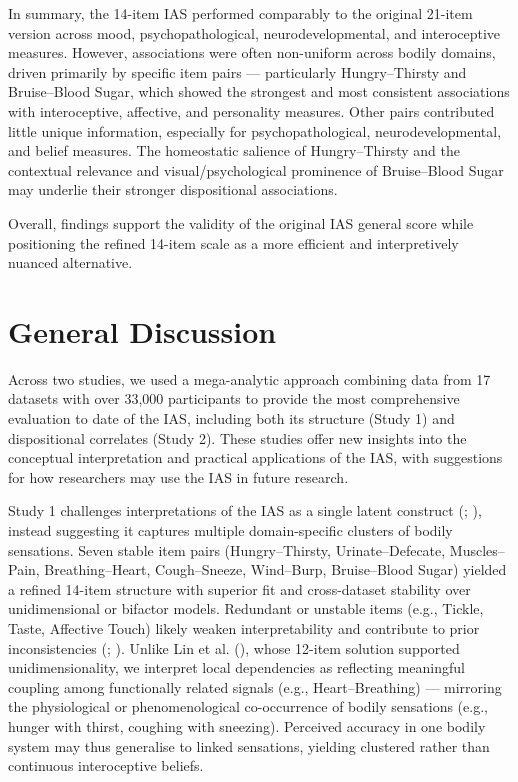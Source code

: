 \documentclass[
  jou,
  floatsintext,
  longtable,
  nolmodern,
  notxfonts,
  notimes,
  colorlinks=true,linkcolor=blue,citecolor=blue,urlcolor=blue]{apa7}
\begin{document}
In summary, the 14-item IAS performed comparably to the original 21-item
version across mood, psychopathological, neurodevelopmental, and
interoceptive measures. However, associations were often non-uniform
across bodily domains, driven primarily by specific item pairs ---
particularly Hungry--Thirsty and Bruise--Blood Sugar, which showed the
strongest and most consistent associations with interoceptive,
affective, and personality measures. Other pairs contributed little
unique information, especially for psychopathological,
neurodevelopmental, and belief measures. The homeostatic salience of
Hungry--Thirsty and the contextual relevance and visual/psychological
prominence of Bruise--Blood Sugar may underlie their stronger
dispositional associations.

Overall, findings support the validity of the original IAS general score
while positioning the refined 14-item scale as a more efficient and
interpretively nuanced alternative.

\section{General Discussion}\label{general-discussion}

Across two studies, we used a mega-analytic approach combining data from
17 datasets with over 33,000 participants to provide the most
comprehensive evaluation to date of the IAS, including both its
structure (Study 1) and dispositional correlates (Study 2). These
studies offer new insights into the conceptual interpretation and
practical applications of the IAS, with suggestions for how researchers
may use the IAS in future research.

Study 1 challenges interpretations of the IAS as a single latent
construct (;
), instead suggesting it
captures multiple domain-specific clusters of bodily sensations. Seven
stable item pairs (Hungry--Thirsty, Urinate--Defecate, Muscles--Pain,
Breathing--Heart, Cough--Sneeze, Wind--Burp, Bruise--Blood Sugar)
yielded a refined 14-item structure with superior fit and cross-dataset
stability over unidimensional or bifactor models. Redundant or unstable
items (e.g., Tickle, Taste, Affective Touch) likely weaken
interpretability and contribute to prior inconsistencies
(;
). Unlike Lin et al.
(), whose 12-item solution supported
unidimensionality, we interpret local dependencies as reflecting
meaningful coupling among functionally related signals (e.g.,
Heart--Breathing) --- mirroring the physiological or phenomenological
co-occurrence of bodily sensations (e.g., hunger with thirst, coughing
with sneezing). Perceived accuracy in one bodily system may thus
generalise to linked sensations, yielding clustered rather than
continuous interoceptive beliefs.
\end{document}
